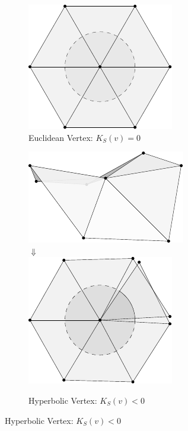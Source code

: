 \documentclass{stdlocal}
\begin{document}
\begin{figure}
\begin{subfigure}[b]{0.32\linewidth}
      \includegraphics[width=0.65\linewidth]{figures/euclidean-vertex-unfolded.pdf}
      \caption{Euclidean Vertex: $K_S(v) = 0$}
    \end{subfigure}
    \begin{subfigure}[b]{0.32\linewidth}
      \centering
      \includegraphics[width=0.65\linewidth]{figures/hyperbolic-vertex.pdf}\\[0.5em]
      $\Downarrow$\\[1em]
      \includegraphics[width=0.65\linewidth]{figures/hyperbolic-vertex-unfolded.pdf}
      \caption{Hyperbolic Vertex: $K_S(v) < 0$}
    \end{subfigure}

\end{figure}
\end{document}
